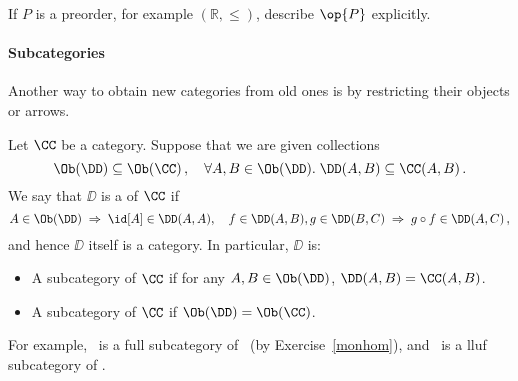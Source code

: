 \documentclass[12pt]{article}
\begin{document}
\begin{myexercise}
If $P$ is a preorder, for example $(\mathbb{R}, \leq )$, describe $\op{P}$ explicitly.
\end{myexercise}

\paragraph{Subcategories} Another way to obtain new categories from old ones is by restricting their objects or arrows.

\begin{mydefinition}
Let $\CC$ be a category. Suppose that we are given collections
\[ \Ob(\DD)\subseteq \Ob(\CC)\,,\quad\forall A,B\in \Ob(\DD).\; \DD(A,B)\subseteq\CC(A,B)\,. \]
We say that $\DD$ is a  of $\CC$ if
\[ A \in \Ob(\DD) \; \Rightarrow \; \id[A] \in \DD(A, A), \quad f \in \DD(A, B), g  \in \DD(B, C) \; \Rightarrow \; g \circ f \in \DD(A, C) \, , \]
and hence $\DD$ itself is a category.
In particular, $\DD$ is:
\begin{itemize}
  \item A  subcategory of $\CC$ if  for any $A,B\in \Ob(\DD)$, $\DD(A,B)=\CC(A,B)$.
  \item A  subcategory of $\CC$ if $\Ob(\DD)=\Ob(\CC)$. \deq
\end{itemize}
\end{mydefinition}
For example, \Grp\ is a full subcategory of \Mon\ (by Exercise~\ref{monhom}), and \Set\ is a lluf subcategory of \Rel.
\end{document}
